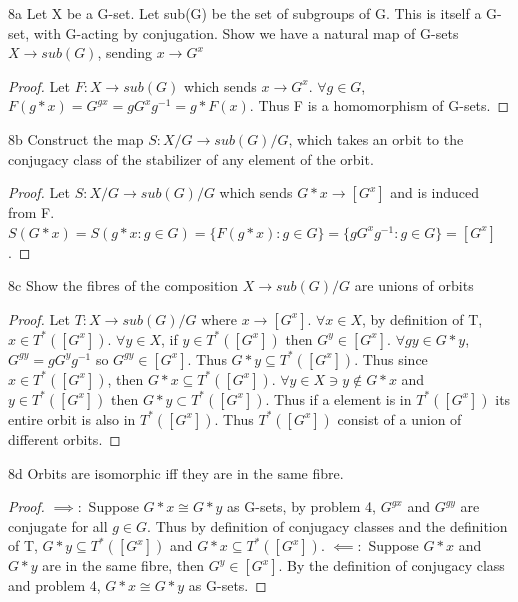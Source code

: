 \documentclass{article}
\begin{document}
\begin{PROB}{8a}\label{Problem 8a.}
    Let X be a G-set.  Let sub(G) be the set of subgroups of G. This is itself a G-set, with G-acting by conjugation. Show we have a natural map of G-sets $X \to sub(G)$, sending $x \to G^x$
\end{PROB}
\begin{proof}
    Let $F: X \to sub(G)$ which sends $x \to G^x$. $\forall g \in G$, $F(g \ast x) = G^{gx} = gG^{x}g^{-1} = g \ast F(x)$. Thus F is a homomorphism of G-sets.
\end{proof}
\begin{PROB}{8b}\label{Problem 8b.}
    Construct the map $S: X/G \to sub(G)/G$, which takes an orbit to the conjugacy class of the stabilizer of any element of the orbit.
\end{PROB}
\begin{proof}
    Let $S: X/G \to sub(G)/G$ which sends $G \ast x \to [G^x]$ and is induced from F. $S(G \ast x) = S({g \ast x : g \in G}) = \{F(g \ast x) : g \in G\} = \{gG^xg^{-1} : g \in G\} = [G^x]$.
\end{proof}
\begin{PROB}{8c}\label{Problem 8c.}
    Show the fibres of the composition $X \to sub(G)/G$ are unions of orbits
\end{PROB}
\begin{proof}
    Let $T: X \to sub(G)/G$ where $x \to [G^x]$. $\forall x \in X$, by definition of T, $x \in T^*([G^x])$. $\forall y \in X$, if $y \in T^*([G^x])$ then $G^y \in [G^x]$. $\forall gy \in G \ast y$, $G^{gy} = gG^{y}g^{-1}$ so $G^{gy} \in [G^x]$. Thus $G \ast y \subseteq T^*([G^x])$. Thus since $x \in T^*([G^x])$, then $G \ast x \subseteq T^*([G^x])$. $\forall y \in X \ni y \not \in G \ast x$ and $y \in T^*([G^x])$ then $G \ast y \subset T^*([G^x])$. Thus if a element is in $T^*([G^x])$ its entire orbit is also in $T^*([G^x])$. Thus $T^*([G^x])$ consist of a union of different orbits. 
\end{proof}
\begin{PROB}{8d}\label{Problem 8d.}
    Orbits are isomorphic iff they are in the same fibre.
\end{PROB}
\begin{proof}
    $\implies :$ Suppose $G \ast x \cong G \ast y$ as G-sets, by problem 4, $G^{gx}$ and $G^{gy}$ are conjugate for all $g \in G$. Thus by definition of conjugacy classes and the definition of T, $G \ast y \subseteq T^*([G^x])$ and $G \ast x \subseteq T^*([G^x])$.
    $\impliedby :$ Suppose $G \ast x$ and $G \ast y$ are in the same fibre, then $G^y \in [G^x]$. By the definition of conjugacy class and problem 4, $G \ast x \cong G \ast y$ as G-sets.
\end{proof}
\end{document}
